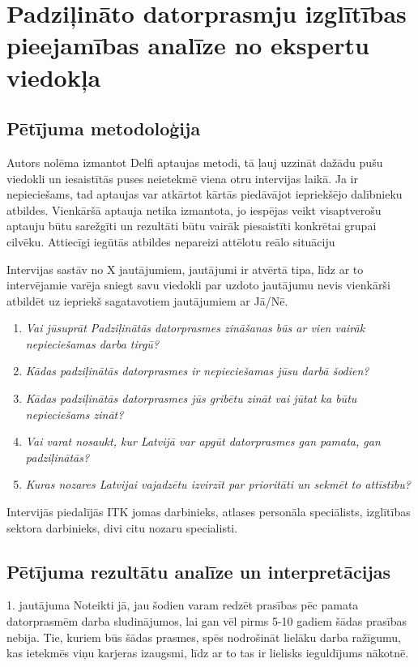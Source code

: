 \section{Padziļināto datorprasmju izglītības pieejamības analīze no ekspertu viedokļa}
\subsection{Pētījuma metodoloģija}
Autors nolēma izmantot Delfi aptaujas metodi, tā ļauj uzzināt dažādu pušu viedokli un iesaistītās puses
neietekmē viena otru intervijas laikā. Ja ir nepieciešams, tad aptaujas var atkārtot kārtās piedāvājot iepriekšējo
dalībnieku atbildes. Vienkāršā aptauja netika izmantota, jo iespējas veikt visaptverošu aptauju būtu sarežgīti
un rezultāti būtu vairāk piesaistīti konkrētai grupai cilvēku. Attiecīgi iegūtās atbildes nepareizi attēlotu reālo situāciju
\par
Intervijas sastāv no X jautājumiem, jautājumi ir atvērtā tipa, līdz ar to intervējamie varēja sniegt savu viedokli par
uzdoto jautājumu nevis vienkārši atbildēt uz iepriekš sagatavotiem jautājumiem ar Jā/Nē.
\begin{enumerate}
    \item \textit{Vai jūsuprāt Padziļinātās datorprasmes zināšanas būs ar vien vairāk nepieciešamas darba tirgū?}
    \item \textit{Kādas padziļinātās datorprasmes ir nepieciešamas jūsu darbā šodien?}
    \item \textit{Kādas padziļinātās datorprasmes jūs gribētu zināt vai jūtat ka būtu nepieciešams zināt?}
    \item \textit{Vai varat nosaukt, kur Latvijā var apgūt datorprasmes gan pamata, gan padziļinātās?}
    \item \textit{Kuras nozares Latvijai vajadzētu izvirzīt par prioritāti un sekmēt to attīstību?}
\end{enumerate}
\par
Intervijās piedalījās ITK jomas darbinieks, atlases personāla speciālists, izglītības sektora darbinieks,
divi citu nozaru specialisti.
\subsection{Pētījuma rezultātu analīze un interpretācijas}
1. jautājuma 
Noteikti jā, jau šodien varam redzēt prasības pēc pamata datorprasmēm darba sludinājumos, lai gan vēl pirms 5-10 gadiem
šādas prasības nebija.
Tie, kuriem būs šādas prasmes, spēs nodrošināt lielāku darba ražīgumu, kas ietekmēs viņu karjeras izaugsmi, līdz ar to 
tas ir lielisks ieguldījums nākotnē.
